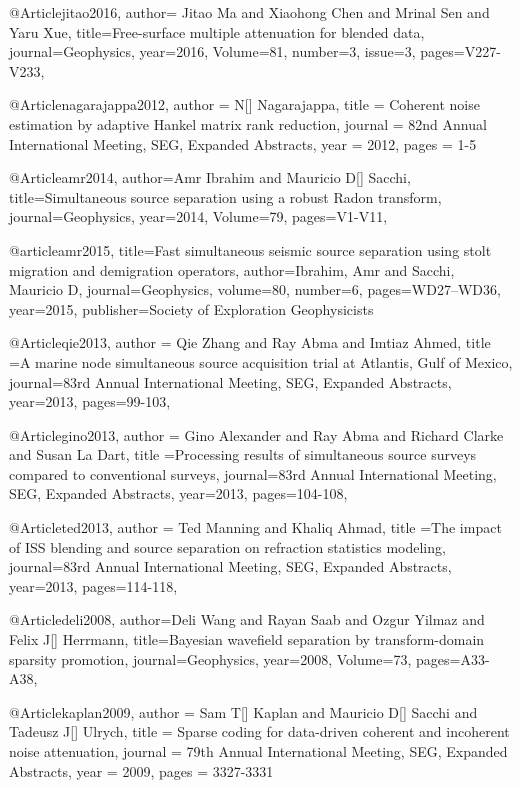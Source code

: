 @Article{jitao2016,
  author={ Jitao Ma and Xiaohong Chen and Mrinal Sen and Yaru Xue},
  title={Free-surface multiple attenuation for blended data},
  journal={Geophysics},
  year=2016,
  Volume=81,
  number=3,
  issue=3,
  pages={V227-V233},
}

@Article{nagarajappa2012,
  author = 	 {N[] Nagarajappa},
  title = 	 {Coherent noise estimation by adaptive Hankel matrix rank reduction},
  journal = 	 {82nd Annual International Meeting, SEG, Expanded Abstracts},
  year = 	 2012,
  pages =	 {1-5}
}

@Article{amr2014,
  author={Amr Ibrahim and Mauricio D[] Sacchi},
  title={Simultaneous source separation using a robust Radon transform},
  journal={Geophysics},
  year=2014,
  Volume=79,
  pages={V1-V11},
}

@article{amr2015,
  title={Fast simultaneous seismic source separation using stolt migration and demigration operators},
  author={Ibrahim, Amr and Sacchi, Mauricio D},
  journal={Geophysics},
  volume={80},
  number={6},
  pages={WD27--WD36},
  year={2015},
  publisher={Society of Exploration Geophysicists}
}

@Article{qie2013,
  author = {Qie Zhang and Ray Abma and Imtiaz Ahmed},
  title ={A marine node simultaneous source acquisition trial at Atlantis, Gulf of Mexico},
  journal={83rd Annual International Meeting, SEG, Expanded Abstracts},
  year=2013,
  pages={99-103},
}

@Article{gino2013,
  author = {Gino Alexander and Ray Abma and Richard Clarke and Susan La Dart},
  title ={Processing results of simultaneous source surveys compared to conventional surveys},
  journal={83rd Annual International Meeting, SEG, Expanded Abstracts},
  year=2013,
  pages={104-108},
}

@Article{ted2013,
  author = {Ted Manning and Khaliq Ahmad},
  title ={The impact of ISS blending and source separation on refraction statistics modeling},
  journal={83rd Annual International Meeting, SEG, Expanded Abstracts},
  year=2013,
  pages={114-118},
}

@Article{deli2008,
  author={Deli Wang and Rayan Saab and Ozgur Yilmaz and Felix J[] Herrmann},
  title={Bayesian wavefield separation by transform-domain sparsity promotion},
  journal={Geophysics},
  year=2008,
  Volume=73,
  pages={A33-A38},
}


@Article{kaplan2009,
  author = 	 {Sam T[] Kaplan and Mauricio D[] Sacchi and Tadeusz J[] Ulrych},
  title = 	 {Sparse coding for data-driven coherent and incoherent noise attenuation},
  journal = 	 {79th Annual International Meeting, SEG, Expanded Abstracts},
  year = 	 2009,
  pages =	 {3327-3331}
}



